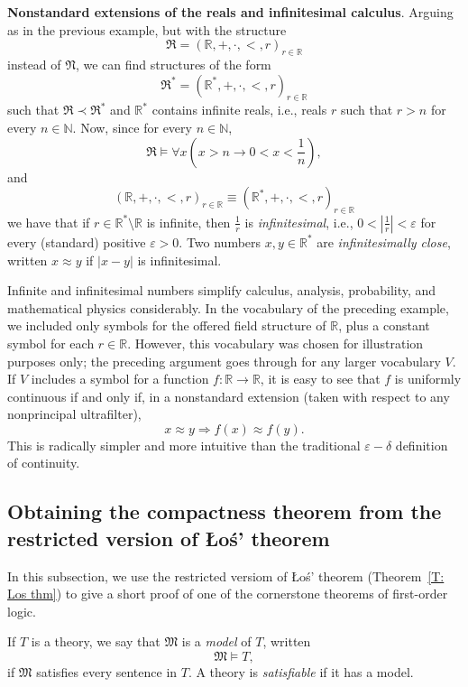 \documentclass{scrartcl}
\renewcommand{\epsilon}{\varepsilon}
\begin{document}
\begin{example}
\textbf{Nonstandard extensions of the reals and infinitesimal calculus}.
\label{E:nonstandard analysis}
Arguing as in the previous example, but with the structure
\[
\mathfrak{R}=(\mathbb{R}, +,\cdot,< ,r)_{r\in\mathbb{R}}
\]
instead of $\mathfrak{N}$, we can find structures of the form
\[
\mathfrak{R}^*=(\mathbb{R}^*, +,\cdot,<, r)_{r\in\mathbb{R}}
\]
such that $\mathfrak{R}\prec \mathfrak{R}^*$ and $\mathbb{R}^*$ contains infinite reals, i.e., reals $r$ such that $r>n$ for every $n\in\mathbb{N}$. Now, since for every $n\in\mathbb{N}$, 
\[
\mathfrak{R}\models \forall x 
\left(x>n\to 0<x<\frac1n\right),
\]
and 
\[
(\mathbb{R},+,\cdot,< ,r)_{r\in\mathbb{R}}\equiv
(\mathbb{R}^*,+,\cdot,<, r)_{r\in\mathbb{R}}
\]
we have that if $r\in\mathbb{R}^*\setminus \mathbb{R}$ is infinite, then $\frac1r$ is \emph{infinitesimal}, i.e., $0<|\frac1r|<\epsilon$ for every (standard) positive $\epsilon>0$. Two numbers $x,y\in\mathbb{R}^*$ are \emph{infinitesimally close}, written $x\approx y$ if $|x-y|$ is infinitesimal.


Infinite and infinitesimal numbers simplify calculus, analysis, probability, and mathematical physics considerably. In the vocabulary of the preceding example, we included only symbols for the offered field structure of $\mathbb{R}$, plus a constant symbol for each $r\in\mathbb{R}$. However,  this vocabulary was chosen for illustration purposes only; the preceding argument goes through for any larger vocabulary $V$. If $V$ includes a symbol for a function $f:\mathbb{R}\to\mathbb{R}$, it is easy to see that  $f$ is uniformly continuous if and only if, in a nonstandard extension (taken with respect to any nonprincipal ultrafilter),
\[
x\approx y \Rightarrow  f(x) \approx f(y).
\] 
This is radically simpler and more intuitive than the traditional $\epsilon-\delta$ definition of continuity.
\end{example}

\subsection{Obtaining the compactness theorem from the restricted version of \L o\'{s}' theorem}
\label{S:compactness from Los}

In this subsection, we use the restricted versiom of Ło\'{s}' theorem (Theorem~\ref{T: Los thm}) to give a short proof of one of the cornerstone theorems of first-order logic.

\begin{definition}
If $T$ is a theory, we say that $\mathfrak{M}$ is a \emph{model} of $T$, written 
\[
\mathfrak{M}\models T,
\]
if $\mathfrak{M}$ satisfies every sentence in $T$.
A theory is \emph{satisfiable} if it has a model.
\end{definition}
\end{document}
